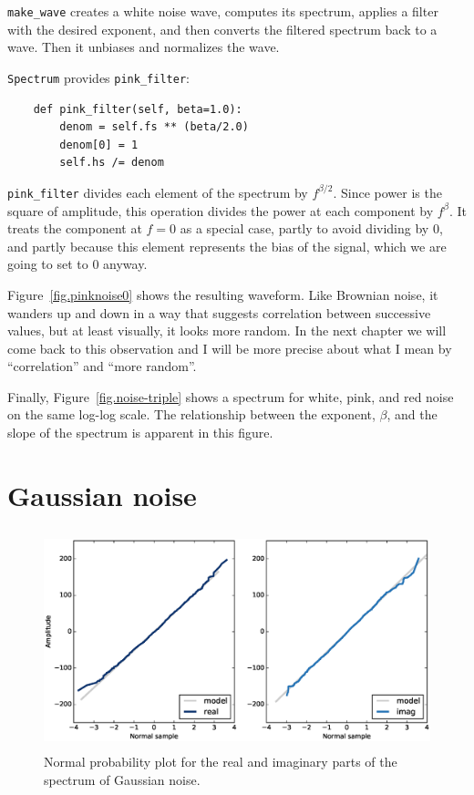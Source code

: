 \documentclass[12pt]{book}
\begin{document}
\verb"make_wave" creates a white noise wave, computes its spectrum,
applies a filter with the desired exponent, and then converts the
filtered spectrum back to a wave.  Then it unbiases and normalizes
the wave.

{\tt Spectrum} provides \verb"pink_filter":

\begin{verbatim}
    def pink_filter(self, beta=1.0):
        denom = self.fs ** (beta/2.0)
        denom[0] = 1
        self.hs /= denom
\end{verbatim}

\verb"pink_filter" divides each element of the spectrum by
$f^{\beta/2}$.  Since power is the square of amplitude, this
operation divides the power at
each component by $f^\beta$.  It treats the component
at $f=0$ as a special case, partly to avoid dividing by 0, and partly
because this element represents the bias of the signal,
which we are going to set to 0 anyway. 

Figure~\ref{fig.pinknoise0} shows the resulting waveform.  Like
Brownian noise, it wanders up and down in a way that suggests
correlation between successive values, but at least visually, it looks
more random.  In the next chapter we will come back to this
observation and I will be more precise about what I mean by
``correlation'' and ``more random''.

Finally, Figure~\ref{fig.noise-triple} shows a spectrum for
white, pink, and red noise on the same log-log scale.
The relationship between the exponent, $\beta$, and the slope
of the spectrum is apparent in this figure.


\section{Gaussian noise}

\begin{figure}
\centerline{\includegraphics[height=2.5in]{figs/noise1.eps}}
\caption{Normal probability plot for the real and imaginary parts
of the spectrum of Gaussian noise.}
\label{fig.noise1}
\end{figure}
\end{document}
